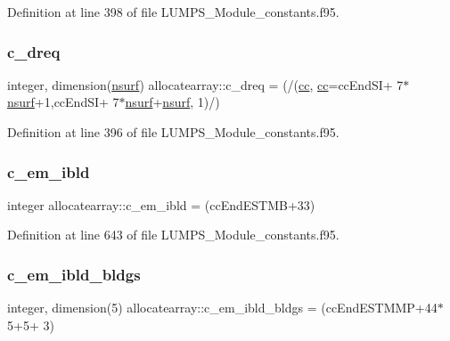 Definition at line 398 of file L\+U\+M\+P\+S\+\_\+\+Module\+\_\+constants.\+f95.

\mbox{\label{namespaceallocatearray_af742d3cef3891253138814e948cfcaa8}} 
\subsubsection{\texorpdfstring{c\+\_\+dreq}{c\_dreq}}
{\footnotesize\ttfamily integer, dimension(\hyperlink{namespaceallocatearray_acd22f92a06f7e9a2a91426b3dc99fdb0}{nsurf}) allocatearray\+::c\+\_\+dreq = (/(\hyperlink{namespaceallocatearray_ac863c81704eb507dee10f5e10741e10c}{cc}, \hyperlink{namespaceallocatearray_ac863c81704eb507dee10f5e10741e10c}{cc}=cc\+End\+SI+ 7$\ast$\hyperlink{namespaceallocatearray_acd22f92a06f7e9a2a91426b3dc99fdb0}{nsurf}+1,cc\+End\+SI+ 7$\ast$\hyperlink{namespaceallocatearray_acd22f92a06f7e9a2a91426b3dc99fdb0}{nsurf}+\hyperlink{namespaceallocatearray_acd22f92a06f7e9a2a91426b3dc99fdb0}{nsurf}, 1)/)}



Definition at line 396 of file L\+U\+M\+P\+S\+\_\+\+Module\+\_\+constants.\+f95.

\mbox{\label{namespaceallocatearray_ac7604ddd8f3d387cfcb277d2576a5374}} 
\subsubsection{\texorpdfstring{c\+\_\+em\+\_\+ibld}{c\_em\_ibld}}
{\footnotesize\ttfamily integer allocatearray\+::c\+\_\+em\+\_\+ibld = (cc\+End\+E\+S\+T\+MB+33)}



Definition at line 643 of file L\+U\+M\+P\+S\+\_\+\+Module\+\_\+constants.\+f95.

\mbox{\label{namespaceallocatearray_ace6f070ae177c567fe76c17bb91034ef}} 
\subsubsection{\texorpdfstring{c\+\_\+em\+\_\+ibld\+\_\+bldgs}{c\_em\_ibld\_bldgs}}
{\footnotesize\ttfamily integer, dimension(5) allocatearray\+::c\+\_\+em\+\_\+ibld\+\_\+bldgs = (cc\+End\+E\+S\+T\+M\+MP+44$\ast$5+5+ 3)}



